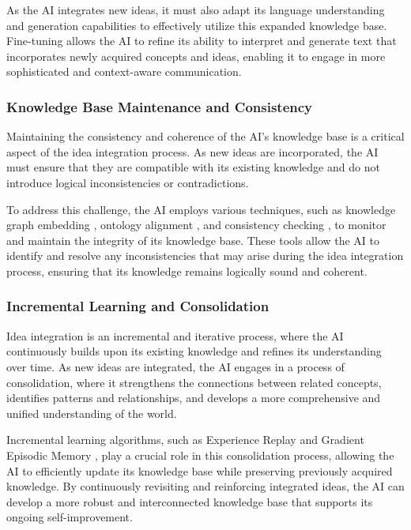 \documentclass[conference]{article}
\begin{document}
	As the AI integrates new ideas, it must also adapt its language understanding and generation capabilities to effectively utilize this expanded knowledge base. Fine-tuning allows the AI to refine its ability to interpret and generate text that incorporates newly acquired concepts and ideas, enabling it to engage in more sophisticated and context-aware communication.
	
	\subsubsection{Knowledge Base Maintenance and Consistency}
	Maintaining the consistency and coherence of the AI's knowledge base is a critical aspect of the idea integration process. As new ideas are incorporated, the AI must ensure that they are compatible with its existing knowledge and do not introduce logical inconsistencies or contradictions.
	
	To address this challenge, the AI employs various techniques, such as knowledge graph embedding \cite{wang2017knowledge}, ontology alignment \cite{euzenat2013ontology}, and consistency checking \cite{li2019consistency}, to monitor and maintain the integrity of its knowledge base. These tools allow the AI to identify and resolve any inconsistencies that may arise during the idea integration process, ensuring that its knowledge remains logically sound and coherent.
	
	\subsubsection{Incremental Learning and Consolidation}
	Idea integration is an incremental and iterative process, where the AI continuously builds upon its existing knowledge and refines its understanding over time. As new ideas are integrated, the AI engages in a process of consolidation, where it strengthens the connections between related concepts, identifies patterns and relationships, and develops a more comprehensive and unified understanding of the world.
	
	Incremental learning algorithms, such as Experience Replay \cite{rolnick2019experience} and Gradient Episodic Memory \cite{lopez2017gradient}, play a crucial role in this consolidation process, allowing the AI to efficiently update its knowledge base while preserving previously acquired knowledge. By continuously revisiting and reinforcing integrated ideas, the AI can develop a more robust and interconnected knowledge base that supports its ongoing self-improvement.
	
\end{document}
